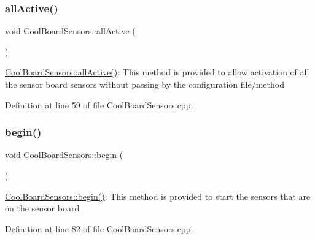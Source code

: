 \subsubsection{\texorpdfstring{all\+Active()}{allActive()}}
{\footnotesize\ttfamily void Cool\+Board\+Sensors\+::all\+Active (\begin{DoxyParamCaption}{ }\end{DoxyParamCaption})}

\hyperlink{class_cool_board_sensors_aa432c5aac88f89c31a10766390f23e0b}{Cool\+Board\+Sensors\+::all\+Active()}\+: This method is provided to allow activation of all the sensor board sensors without passing by the configuration file/method 

Definition at line 59 of file Cool\+Board\+Sensors.\+cpp.

\mbox{\label{class_cool_board_sensors_a97095823ef7c8f5290812f1405b966b3}} 
\subsubsection{\texorpdfstring{begin()}{begin()}}
{\footnotesize\ttfamily void Cool\+Board\+Sensors\+::begin (\begin{DoxyParamCaption}{ }\end{DoxyParamCaption})}

\hyperlink{class_cool_board_sensors_a97095823ef7c8f5290812f1405b966b3}{Cool\+Board\+Sensors\+::begin()}\+: This method is provided to start the sensors that are on the sensor board 

Definition at line 82 of file Cool\+Board\+Sensors.\+cpp.

